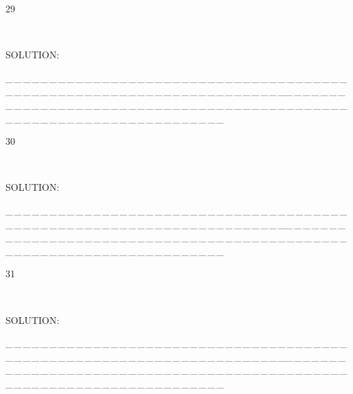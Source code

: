 \documentclass[a4paper, 11pt, UTF8]{article}
\begin{document}
\begin{large}
{\timesbf\Large 29} {\timessl\Large 
}\par\quad\,
{\timessl\Large
}\par
{\timesbf S\footnotesize{OLUTION:}}\par\quad

\par
{\tiny \_\,\_\,\_\,\_\,\_\,\_\,\_\,\_\,\_\,\_\,\_\,\_\,\_\,\_\,\_\,\_\,\_\,\_\,\_\,\_\,\_\,\_\,\_\,\_\,\_\,\_\,\_\,\_\,\_\,\_\,\_\,\_\,\_\,\_\,\_\,\_\,\_\,\_\,\_\,\_\,\_\,\_\,\_\,\_\,\_\,\_\,\_\,\_\,\_\,\_\,\_\,\_\,\_\,\_\,\_\,\_\,\_\,\_\,\_\,\_\,\_\,\_\,\_\,\_\,\_\,\_\,\_\,\_\,\_\,\_\,\_\_\,\_\,\_\,\_\,\_\,\_\,\_\,\_\,\_\,\_\,\_\,\_\,\_\,\_\,\_\,\_\,\_\,\_\,\_\,\_\,\_\,\_\,\_\,\_\,\_\,\_\,\_\,\_\,\_\,\_\,\_\,\_\,\_\,\_\,\_\,\_\,\_\,\_\,\_\,\_\,\_\,\_\,\_\,\_\,\_\,\_\,\_\,\_\,\_\,\_\,\_\,\_\,\_\,\_\,\_\,\_\,\_\,\_\,\_\,\_\,\_\,\_\,\_\,\_\,\_\,\_\,\_\,\_\,\_\,\_\,\_}\par

{\timesbf\Large 30} {\timessl\Large 
}\par\quad\,
{\timessl\Large
}\par
{\timesbf S\footnotesize{OLUTION:}}\par\quad

\par
{\tiny \_\,\_\,\_\,\_\,\_\,\_\,\_\,\_\,\_\,\_\,\_\,\_\,\_\,\_\,\_\,\_\,\_\,\_\,\_\,\_\,\_\,\_\,\_\,\_\,\_\,\_\,\_\,\_\,\_\,\_\,\_\,\_\,\_\,\_\,\_\,\_\,\_\,\_\,\_\,\_\,\_\,\_\,\_\,\_\,\_\,\_\,\_\,\_\,\_\,\_\,\_\,\_\,\_\,\_\,\_\,\_\,\_\,\_\,\_\,\_\,\_\,\_\,\_\,\_\,\_\,\_\,\_\,\_\,\_\,\_\,\_\_\,\_\,\_\,\_\,\_\,\_\,\_\,\_\,\_\,\_\,\_\,\_\,\_\,\_\,\_\,\_\,\_\,\_\,\_\,\_\,\_\,\_\,\_\,\_\,\_\,\_\,\_\,\_\,\_\,\_\,\_\,\_\,\_\,\_\,\_\,\_\,\_\,\_\,\_\,\_\,\_\,\_\,\_\,\_\,\_\,\_\,\_\,\_\,\_\,\_\,\_\,\_\,\_\,\_\,\_\,\_\,\_\,\_\,\_\,\_\,\_\,\_\,\_\,\_\,\_\,\_\,\_\,\_\,\_\,\_\,\_}\par

{\timesbf\Large 31} {\timessl\Large 
}\par\quad\,
{\timessl\Large
}\par
{\timesbf S\footnotesize{OLUTION:}}\par\quad

\par
{\tiny \_\,\_\,\_\,\_\,\_\,\_\,\_\,\_\,\_\,\_\,\_\,\_\,\_\,\_\,\_\,\_\,\_\,\_\,\_\,\_\,\_\,\_\,\_\,\_\,\_\,\_\,\_\,\_\,\_\,\_\,\_\,\_\,\_\,\_\,\_\,\_\,\_\,\_\,\_\,\_\,\_\,\_\,\_\,\_\,\_\,\_\,\_\,\_\,\_\,\_\,\_\,\_\,\_\,\_\,\_\,\_\,\_\,\_\,\_\,\_\,\_\,\_\,\_\,\_\,\_\,\_\,\_\,\_\,\_\,\_\,\_\_\,\_\,\_\,\_\,\_\,\_\,\_\,\_\,\_\,\_\,\_\,\_\,\_\,\_\,\_\,\_\,\_\,\_\,\_\,\_\,\_\,\_\,\_\,\_\,\_\,\_\,\_\,\_\,\_\,\_\,\_\,\_\,\_\,\_\,\_\,\_\,\_\,\_\,\_\,\_\,\_\,\_\,\_\,\_\,\_\,\_\,\_\,\_\,\_\,\_\,\_\,\_\,\_\,\_\,\_\,\_\,\_\,\_\,\_\,\_\,\_\,\_\,\_\,\_\,\_\,\_\,\_\,\_\,\_\,\_\,\_}\par


\end{large}
\end{document}
